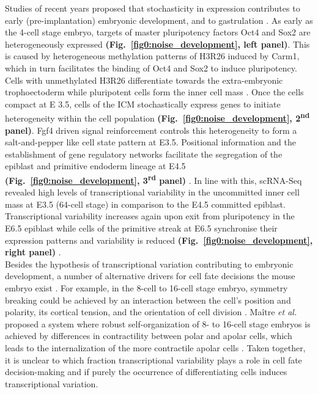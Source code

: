 Studies of recent years proposed that stochasticity in expression contributes to early (pre-implantation) embryonic development, and to gastrulation \citep{Dietrich2007}. 
As early as the 4-cell stage embryo, targets of master pluripotency factors Oct4 and Sox2 are heterogeneously expressed \textbf{(Fig.~\ref{fig0:noise_development}, left panel)}. 
This is caused by heterogeneous methylation patterns of \gls{H3R26} induced by \gls{Carm1}, which in turn facilitates the binding of Oct4 and Sox2 to induce pluripotency. 
Cells with unmethylated H3R26 differentiate towards the extra-embryonic trophoectoderm while pluripotent cells form the inner cell mass \citep{Goolam2016}. 
Once the cells compact at \gls{E} 3.5, cells of the \gls{ICM} stochastically express genes to initiate heterogeneity within the cell population \textbf{(Fig.~\ref{fig0:noise_development}, 2\textsuperscript{nd} panel)}. 
Fgf4 driven signal reinforcement controls this heterogeneity to form a salt-and-pepper like cell state pattern at E3.5. 
Positional information and the establishment of gene regulatory networks facilitate the segregation of the epiblast and primitive endoderm lineage at E4.5 \textbf{(Fig.~\ref{fig0:noise_development}, 3\textsuperscript{rd} panel)} \citep{Ohnishi2014}. 
In line with this, scRNA-Seq revealed high levels of transcriptional variability in the uncommitted inner cell mass at E3.5 (64-cell stage) in comparison to the E4.5 committed epiblast. 
Transcriptional variability increases again upon exit from pluripotency in the E6.5 epiblast while cells of the primitive streak at E6.5 synchronise their expression patterns and variability is reduced \textbf{(Fig.~\ref{fig0:noise_development}, right panel)} \citep{Mohammed2017}. \\

Besides the hypothesis of transcriptional variation contributing to embryonic development, a number of alternative drivers for cell fate decisions the mouse embryo exist \citep{Zhang2018a}. 
For example, in the 8-cell to 16-cell stage embryo, symmetry breaking could be achieved by an interaction between the cell’s position and polarity, its cortical tension, and the orientation of cell division \citep{Zhang2018a}. 
Maître \emph{et al.} proposed a system where robust self-organization of 8- to 16-cell stage embryos is achieved by differences in contractility between polar and apolar cells, which leads to the internalization of the more contractile apolar cells \citep{Maitre2016}. 
Taken together, it is unclear to which fraction transcriptional variability plays a role in cell fate decision-making and if purely the occurrence of differentiating cells induces transcriptional variation. 

